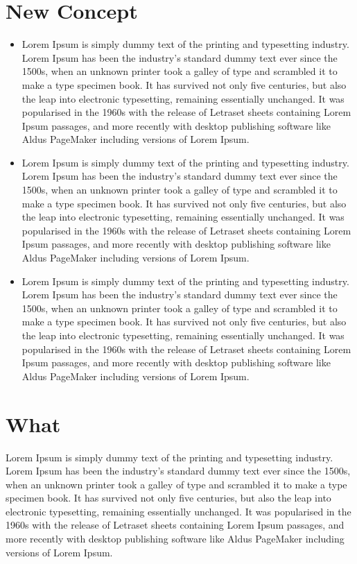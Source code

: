 \documentclass[12pt,a4paper]{report}
\begin{document}
\begin{CJK*}{UTF8}{bkai}
    \section{New Concept}
    \begin{itemize}
        \item Lorem Ipsum is simply dummy text of the printing and typesetting industry. Lorem Ipsum has been the industry's standard dummy text ever since the 1500s, when an unknown printer took a galley of type and scrambled it to make a type specimen book. It has survived not only five centuries, but also the leap into electronic typesetting, remaining essentially unchanged. It was popularised in the 1960s with the release of Letraset sheets containing Lorem Ipsum passages, and more recently with desktop publishing software like Aldus PageMaker including versions of Lorem Ipsum.
        \item Lorem Ipsum is simply dummy text of the printing and typesetting industry. Lorem Ipsum has been the industry's standard dummy text ever since the 1500s, when an unknown printer took a galley of type and scrambled it to make a type specimen book. It has survived not only five centuries, but also the leap into electronic typesetting, remaining essentially unchanged. It was popularised in the 1960s with the release of Letraset sheets containing Lorem Ipsum passages, and more recently with desktop publishing software like Aldus PageMaker including versions of Lorem Ipsum.
        \item Lorem Ipsum is simply dummy text of the printing and typesetting industry. Lorem Ipsum has been the industry's standard dummy text ever since the 1500s, when an unknown printer took a galley of type and scrambled it to make a type specimen book. It has survived not only five centuries, but also the leap into electronic typesetting, remaining essentially unchanged. It was popularised in the 1960s with the release of Letraset sheets containing Lorem Ipsum passages, and more recently with desktop publishing software like Aldus PageMaker including versions of Lorem Ipsum.
    \end{itemize}

    \section{What}
    Lorem Ipsum is simply dummy text of the printing and typesetting industry. Lorem Ipsum has been the industry's standard dummy text ever since the 1500s, when an unknown printer took a galley of type and scrambled it to make a type specimen book. It has survived not only five centuries, but also the leap into electronic typesetting, remaining essentially unchanged. It was popularised in the 1960s with the release of Letraset sheets containing Lorem Ipsum passages, and more recently with desktop publishing software like Aldus PageMaker including versions of Lorem Ipsum.


\end{CJK*}
\end{document}
